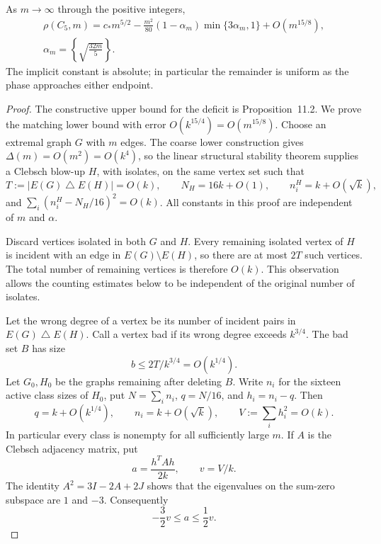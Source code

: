 \begin{theorem}
\label{thm:phase-law}
As $m\to\infty$ through the positive integers,
\begin{equation}\tag{59}\label{eq:phase-law}
 \begin{gathered}
 \rho(C_5,m)=c_\ast m^{5/2}
   -\frac{m^2}{80}(1-\alpha_m)\min\{3\alpha_m,1\}+O(m^{15/8}),\\
 \alpha_m=\left\{\sqrt{\frac{32m}{5}}\right\}.
 \end{gathered}
\end{equation}
The implicit constant is absolute; in particular the remainder is uniform
as the phase approaches either endpoint.
\end{theorem}
\begin{proof}
The constructive upper bound for the deficit is Proposition~11.2. We
prove the matching lower bound with error $O(k^{15/4})=O(m^{15/8})$.
Choose an extremal graph $G$ with $m$ edges. The coarse lower construction
gives $\Delta(m)=O(m^2)=O(k^4)$, so the linear structural stability
theorem supplies a Clebsch blow-up $H$, with isolates, on the same vertex
set such that
\begin{equation}\tag{60}\label{eq:phase-structure}
 T:=|E(G)\mathbin\triangle E(H)|=O(k),\qquad
 N_H=16k+O(1),\qquad n_i^H=k+O(\sqrt{k}),
\end{equation}
and $\sum_i(n_i^H-N_H/16)^2=O(k)$. All constants in this proof are
independent of $m$ and $\alpha$.

Discard vertices isolated in both $G$ and $H$. Every remaining isolated
vertex of $H$ is incident with an edge in $E(G)\setminus E(H)$, so there
are at most $2T$ such vertices. The total number of remaining vertices is
therefore $O(k)$. This observation allows the counting estimates below to
be independent of the original number of isolates.

Let the wrong degree of a vertex be its number of incident pairs in
$E(G)\mathbin\triangle E(H)$. Call a vertex bad if its wrong degree
exceeds $k^{3/4}$. The bad set $B$ has size
\[
 b\leq2T/k^{3/4}=O(k^{1/4}).
\]
Let $G_0,H_0$ be the graphs remaining after deleting $B$. Write $n_i$ for
the sixteen active class sizes of $H_0$, put $N=\sum_i n_i$, $q=N/16$, and
$h_i=n_i-q$. Then
\begin{equation}\tag{61}\label{eq:phase-masses}
 q=k+O(k^{1/4}),\qquad n_i=k+O(\sqrt{k}),\qquad
 V:=\sum_i h_i^2=O(k).
\end{equation}
In particular every class is nonempty for all sufficiently large $m$. If
$A$ is the Clebsch adjacency matrix, put
\[
 a=\frac{h^TAh}{2k},\qquad v=V/k.
\]
The identity $A^2=3I-2A+2J$ shows that the eigenvalues on the sum-zero
subspace are $1$ and $-3$. Consequently
\begin{equation}\tag{62}\label{eq:phase-spectrum}
 -\frac32v\leq a\leq\frac12v.
\end{equation}


\end{proof}
